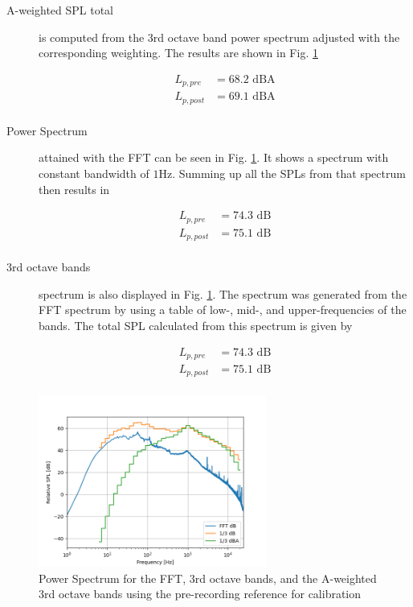 \documentclass[twocolumn]{article}
\begin{document}
\begin{description}
\item[A-weighted SPL total] is computed from the 3rd octave band power spectrum adjusted with the
    corresponding weighting.
    The results are shown in Fig. \ref{fig:power_spectrum}

\begin{equation}
\begin{aligned}
    L_{p,pre} & = 68.2 \textrm{ dBA} \\
    L_{p,post} & = 69.1 \textrm{ dBA} \\
\end{aligned}
\end{equation}

\item[Power Spectrum] attained with the FFT can be seen in Fig. \ref{fig:power_spectrum}.
    It shows a spectrum with constant bandwidth of $1\textrm{Hz}$.
    Summing up all the SPLs from that spectrum then results in

\begin{equation}
\begin{aligned}
    L_{p,pre} & = 74.3 \textrm{ dB} \\
    L_{p,post} & = 75.1 \textrm{ dB} \\
\end{aligned}
\end{equation}

\item[3rd octave bands] spectrum is also displayed in Fig. \ref{fig:power_spectrum}.
    The spectrum was generated from the FFT spectrum by using a table of low-, mid-, and
    upper-frequencies of the bands.
    The total SPL calculated from this spectrum is given by

\begin{equation}
\begin{aligned}
    L_{p,pre} & = 74.3 \textrm{ dB} \\
    L_{p,post} & = 75.1 \textrm{ dB} \\
\end{aligned}
\end{equation}

\end{description}

\begin{figure}[H]
    \centering
    \includegraphics[width=75mm]{./Images/spectrum_plot_step.png}
    \caption{Power Spectrum for the FFT, 3rd octave bands, and the A-weighted 3rd octave bands using the
    pre-recording reference for calibration}
    \label{fig:power_spectrum}
\end{figure}
\end{document}

